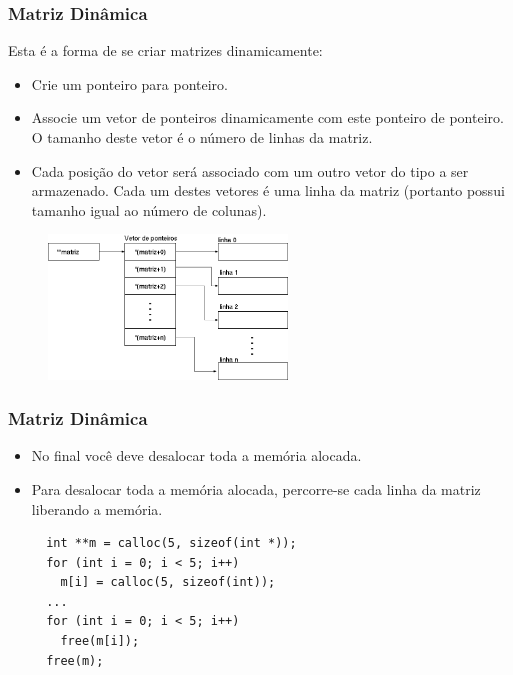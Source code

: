 \documentclass[aspectratio=169]{beamer}
\begin{document}

\begin{frame}
  \frametitle{Matriz Dinâmica}
Esta é a forma de se criar matrizes dinamicamente:
\begin{itemize}
\item Crie um ponteiro para ponteiro. 
\item Associe um vetor de ponteiros dinamicamente com este ponteiro de
ponteiro. O tamanho deste vetor é o número de linhas da matriz.
\item Cada posição do vetor será associado com um outro vetor do tipo a
ser armazenado. Cada um destes vetores é uma linha da matriz (portanto possui tamanho igual ao número de colunas).
\end{itemize}
\begin{figure}[!ht]
  \centering
  \includegraphics[width=180pt]{imgs/matriz_dinamica2.png}
\end{figure}
\end{frame}


\begin{frame}[fragile]
\frametitle{Matriz Dinâmica}
\begin{itemize}
\item No final você deve desalocar toda a memória alocada.
\item Para desalocar toda a memória alocada, percorre-se cada linha da matriz liberando a memória.
\begin{lstlisting}
  int **m = calloc(5, sizeof(int *));
  for (int i = 0; i < 5; i++)
    m[i] = calloc(5, sizeof(int));
  ...
  for (int i = 0; i < 5; i++)
    free(m[i]);
  free(m);
\end{lstlisting}
\end{itemize}
\end{frame}

\end{document}
